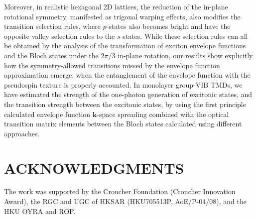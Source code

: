 \documentclass[prb,twocolumn,amsmath,amssymb,superscriptaddress,showpacs]{revtex4}
\begin{document}
Moreover, in realistic hexagonal 2D lattices, the reduction of the in-plane rotational symmetry, manifested as trigonal warping effects, also modifies the transition selection rules, where $p$-states also becomes bright and have the opposite valley selection rules to the $s$-states. While these selection rules can all be obtained by the analysis of the transformation of exciton envelope functions and the Bloch states under the $2\pi/3$ in-plane rotation, our results show explicitly how the symmetry-allowed transitions missed by the envelope function approximation emerge, when the entanglement of the envelope function with the pseudospin texture is properly accounted.  In monolayer group-VIB TMDs, we have estimated the strength of the one-photon generation of excitonic states, and the transition strength between the excitonic states, by using the first principle calculated envelope function $\mathbf k$-space spreading combined with the optical transition matrix elements between the Bloch states calculated using different approaches.

\section{ACKNOWLEDGMENTS}

The work was supported by the Croucher Foundation (Croucher Innovation Award), the RGC and UGC of HKSAR (HKU705513P, AoE/P-04/08), and the HKU OYRA and ROP.
\end{document}
